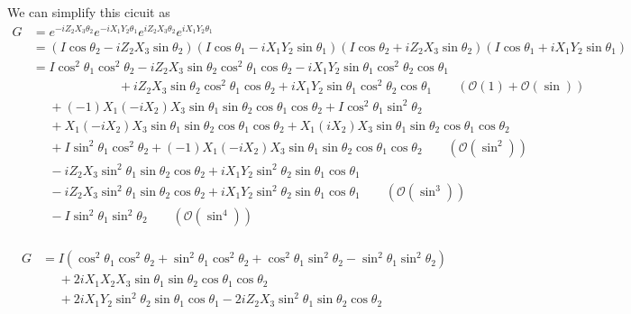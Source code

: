 \documentclass{report}
\begin{document}
We can simplify this cicuit as 
\begin{equation}
\begin{aligned}
  G &= e^{-iZ_2 X_3 \theta_2} e^{-iX_1 Y_2 \theta_1} e^{iZ_2 X_3 \theta_2} e^{iX_1 Y_2 \theta_1} \\
  &= (I \cos\theta_2 - iZ_2 X_3 \sin\theta_2) (I \cos\theta_1 - iX_1 Y_2 \sin\theta_1) (I \cos\theta_2 + iZ_2 X_3 \sin\theta_2) (I \cos\theta_1 + iX_1 Y_2 \sin\theta_1) \\
  &= I \cos^2\theta_1\cos^2\theta_2 - iZ_2 X_3 \sin\theta_2 \cos^2\theta_1 \cos\theta_2 - iX_1 Y_2 \sin\theta_1 \cos^2\theta_2 \cos\theta_1 \\
  &\phantom{I \cos^2\theta_1\cos^2\theta_2 } + iZ_2 X_3 \sin\theta_2 \cos^2\theta_1 \cos\theta_2 + iX_1 Y_2 \sin\theta_1 \cos^2\theta_2 \cos\theta_1 \qquad (\mathcal{O}(1) + \mathcal{O}(\sin)) \\ 
  &\phantom{=} + (-1)X_1(-iX_2)X_3 \sin\theta_1 \sin\theta_2 \cos\theta_1 \cos\theta_2 + I \cos^2\theta_1 \sin^2\theta_2 \\ 
  &\phantom{=} + X_1(-iX_2)X_3 \sin\theta_1 \sin\theta_2 \cos\theta_1 \cos\theta_2 + X_1(iX_2)X_3 \sin\theta_1 \sin\theta_2 \cos\theta_1 \cos\theta_2 \\
  &\phantom{=} + I \sin^2\theta_1 \cos^2\theta_2 + (-1)X_1(-iX_2)X_3 \sin\theta_1 \sin\theta_2 \cos\theta_1 \cos\theta_2  \qquad (\mathcal{O}(\sin^2))\\ 
  &\phantom{=}  -iZ_2 X_3 \sin^2\theta_1 \sin\theta_2 \cos\theta_2 + iX_1 Y_2 \sin^2\theta_2 \sin\theta_1 \cos\theta_1 \\
  &\phantom{=} -iZ_2 X_3 \sin^2\theta_1 \sin\theta_2 \cos\theta_2 + iX_1Y_2 \sin^2\theta_2 \sin\theta_1 \cos\theta_1 \qquad (\mathcal{O}(\sin^3)) \\ 
  &\phantom{=} - I\sin^2 \theta_1 \sin^2 \theta_2 \qquad (\mathcal{O}(\sin^4)) \\ 
\end{aligned}
\end{equation}

\begin{equation}
  \boxed{\begin{aligned}
G &= I (\cos^2\theta_1\cos^2\theta_2 + \sin^2\theta_1 \cos^2\theta_2 + \cos^2\theta_1 \sin^2\theta_2 - \sin^2 \theta_1 \sin^2 \theta_2) \\
&\phantom{=} + 2i X_1 X_2 X_3 \sin\theta_1 \sin\theta_2 \cos\theta_1 \cos\theta_2 \\
&\phantom{=} + 2i X_1 Y_2 \sin^2\theta_2 \sin\theta_1 \cos\theta_1 - 2i Z_2 X_3 \sin^2\theta_1 \sin\theta_2 \cos\theta_2 
\end{aligned}}
\end{equation}
\end{document}
